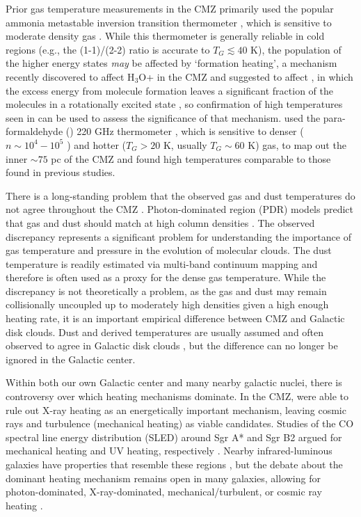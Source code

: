 Prior gas temperature measurements in the CMZ primarily used the popular
ammonia metastable inversion transition thermometer \citep[\ammonia (1,1) -
(7,7);][]{Guesten1981a,Huettemeister1993a,Ott2014a,Mauersberger1986a}, which is
sensitive to moderate density gas \citep[$n(\hh) \sim 10^3-10^4$
\percc;][]{Shirley2015a}.  While this thermometer is generally reliable in cold
regions (e.g., the (1-1)/(2-2) ratio is accurate to $T_G\lesssim40$ K), the
population of the higher energy states \emph{may} be affected by `formation
heating', a mechanism recently discovered to affect H$_3$O+ in the CMZ and
suggested to affect \ammonia, in which the excess energy from molecule
formation leaves a significant fraction of the molecules in a rotationally
excited state \citep[][]{Lis2014a}, so confirmation of high temperatures seen
in \ammonia \citep{Mills2013a} can be used to assess the significance of that
mechanism.  \citet{Ao2013a} used the para-formaldehyde (\para) 220 GHz
thermometer \citep{Mangum1993a}, which is sensitive to denser ($n\sim10^4-10^5$
\percc) and hotter ($T_G>20$ K, usually $T_G\sim60$ K) gas, to map out the
inner $\sim75$ pc of the CMZ and found high temperatures comparable to those
found in previous studies.

There is a long-standing problem that the observed gas and dust temperatures do
not agree throughout the CMZ
\citep{Guesten1981a,Molinari2011a,Ao2013a,Ott2014a}.  Photon-dominated region
(PDR) models predict that gas and dust should match at high column densities
\citep{Hollenbach1999a}.  The observed discrepancy represents a significant
problem for understanding the importance of gas temperature and pressure in the
evolution of molecular clouds.  The dust temperature is readily estimated via
multi-band continuum mapping and therefore is often used as a proxy for the
dense gas temperature.  While the discrepancy is not theoretically a problem,
as the gas and dust may remain collisionally uncoupled up to moderately high
densities given a high enough heating rate, it is an important empirical
difference between CMZ and Galactic disk clouds.  Dust and \ammonia derived
temperatures are usually assumed and often observed to agree in Galactic disk
clouds \citep{Pillai2006a,Dunham2010a,Juvela2012a,Battersby2014a}, but the
difference can no longer be ignored in the Galactic center.

Within both our own Galactic center and many nearby galactic nuclei, there is
controversy over which heating mechanisms dominate.  In the CMZ,
\citet{Ao2013a} were able to rule out X-ray heating as an energetically
important mechanism, leaving cosmic rays and turbulence (mechanical heating) as
viable candidates.  Studies of the CO spectral line energy distribution (SLED)
around Sgr A* and Sgr B2 argued for mechanical heating and UV heating,
respectively \citep{Goicoechea2013a,Etxaluze2013a}.  Nearby infrared-luminous
galaxies have properties that resemble these regions
\citep{Kamenetzky2012a,Kamenetzky2014a}, but the debate about the dominant
heating mechanism remains open in many galaxies, allowing for photon-dominated,
X-ray-dominated, mechanical/turbulent, or cosmic ray heating
\citep{Loenen2008a,Papadopolous2011a,Meijerink2011a,Bayet2011a,Mangum2013a,Papadopolous2013a}.

